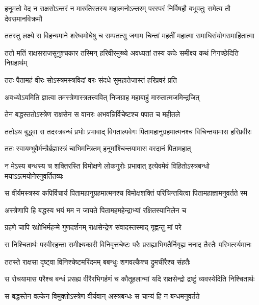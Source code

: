 \twolineshloka
{हनूमतो वेद न राक्षसोऽन्तरं न मारुतिस्तस्य महात्मनोऽन्तरम्}
{परस्परं निर्विषहौ बभूवतुः समेत्य तौ देवसमानविक्रमौ} %

\twolineshloka
{ततस्तु लक्ष्ये स विहन्यमाने शरेष्वमोघेषु च सम्पतत्सु}
{जगाम चिन्तां महतीं महात्मा समाधिसंयोगसमाहितात्मा} %

\twolineshloka
{ततो मतिं राक्षसराजसूनुश्चकार तस्मिन् हरिवीरमुख्ये}
{अवध्यतां तस्य कपेः समीक्ष्य कथं निगच्छेदिति निग्रहार्थम्} %

\twolineshloka
{ततः पैतामहं वीरः सोऽस्त्रमस्त्रविदां वरः}
{संदधे सुमहातेजास्तं हरिप्रवरं प्रति} %

\twolineshloka
{अवध्योऽयमिति ज्ञात्वा तमस्त्रेणास्त्रतत्त्ववित्}
{निजग्राह महाबाहुं मारुतात्मजमिन्द्रजित्} %

\twolineshloka
{तेन बद्धस्ततोऽस्त्रेण राक्षसेन स वानरः}
{अभवन्निर्विचेष्टश्च पपात च महीतले} %

\twolineshloka
{ततोऽथ बुद्ध्वा स तदस्त्रबन्धं प्रभोः प्रभावाद् विगताल्पवेगः}
{पितामहानुग्रहमात्मनश्च विचिन्तयामास हरिप्रवीरः} %

\twolineshloka
{ततः स्वायम्भुवैर्मन्त्रैर्ब्रह्मास्त्रं चाभिमन्त्रितम्}
{हनूमांश्चिन्तयामास वरदानं पितामहात्} %

\twolineshloka
{न मेऽस्य बन्धस्य च शक्तिरस्ति विमोक्षणे लोकगुरोः प्रभावात्}
{इत्येवमेवं विहितोऽस्त्रबन्धो मयाऽऽत्मयोनेरनुवर्तितव्यः} %

\twolineshloka
{स वीर्यमस्त्रस्य कपिर्विचार्य पितामहानुग्रहमात्मनश्च}
{विमोक्षशक्तिं परिचिन्तयित्वा पितामहाज्ञामनुवर्तते स्म} %

\twolineshloka
{अस्त्रेणापि हि बद्धस्य भयं मम न जायते}
{पितामहमहेन्द्राभ्यां रक्षितस्यानिलेन च} %

\twolineshloka
{ग्रहणे चापि रक्षोभिर्महन्मे गुणदर्शनम्}
{राक्षसेन्द्रेण संवादस्तस्माद् गृह्णन्तु मां परे} %

\twolineshloka
{स निश्चितार्थः परवीरहन्ता समीक्ष्यकारी विनिवृत्तचेष्टः}
{परैः प्रसह्याभिगतैर्निगृह्य ननाद तैस्तैः परिभर्त्स्यमानः} %

\twolineshloka
{ततस्ते राक्षसा दृष्ट्वा विनिश्चेष्टमरिंदमम्}
{बबन्धुः शणवल्कैश्च द्रुमचीरैश्च संहतैः} %

\twolineshloka
{स रोचयामास परैश्च बन्धं प्रसह्य वीरैरभिगर्हणं च}
{कौतूहलान्मां यदि राक्षसेन्द्रो द्रष्टुं व्यवस्येदिति निश्चितार्थः} %

\twolineshloka
{स बद्धस्तेन वल्केन विमुक्तोऽस्त्रेण वीर्यवान्}
{अस्त्रबन्धः स चान्यं हि न बन्धमनुवर्तते} %

